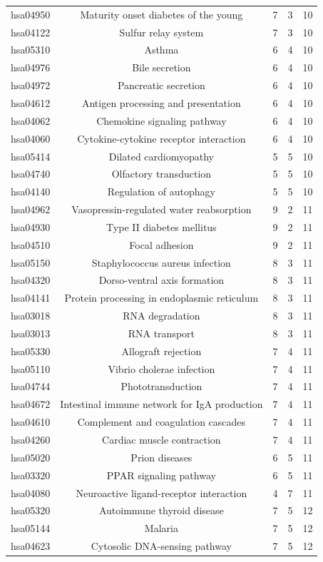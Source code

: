 \documentclass[Minh_PhD_thesis.tex]{subfiles}
\begin{document}
\begin{center}
\begin{longtable}{@{}ccccc@{}}
hsa04950	&Maturity onset diabetes of the young&	7&	3&	10\\
hsa04122	&Sulfur relay system&	7&	3&	10\\
hsa05310	&Asthma&	6&	4&	10\\
hsa04976	&Bile secretion&	6&	4&	10\\
hsa04972	&Pancreatic secretion&	6&	4&	10\\
hsa04612	&Antigen processing and presentation&	6&	4&	10\\
hsa04062	&Chemokine signaling pathway&	6&	4&	10\\
hsa04060	&Cytokine-cytokine receptor interaction&	6&	4&	10\\
hsa05414	&Dilated cardiomyopathy&	5&	5&	10\\
hsa04740	&Olfactory transduction&	5&	5&	10\\
hsa04140	&Regulation of autophagy&	5&	5&	10\\
hsa04962	&Vasopressin-regulated water reabsorption&	9&	2&	11\\
hsa04930	&Type II diabetes mellitus&	9&	2&	11\\
hsa04510	&Focal adhesion&	9&	2&	11\\
hsa05150	&Staphylococcus aureus infection&	8&	3&	11\\
hsa04320	&Dorso-ventral axis formation&	8&	3&	11\\
hsa04141	&Protein processing in endoplasmic reticulum&	8&	3&	11\\
hsa03018	&RNA degradation&	8&	3&	11\\
hsa03013	&RNA transport&	8&	3&	11\\
hsa05330	&Allograft rejection&	7&	4&	11\\
hsa05110	&Vibrio cholerae infection&	7&	4&	11\\
hsa04744	&Phototransduction&	7&	4&	11\\
hsa04672	&Intestinal immune network for IgA production&	7&	4&	11\\
hsa04610	&Complement and coagulation cascades&	7&	4&	11\\
hsa04260	&Cardiac muscle contraction&	7&	4&	11\\
hsa05020	&Prion diseases&	6&	5&	11\\
hsa03320	&PPAR signaling pathway&	6&	5&	11\\
hsa04080	&Neuroactive ligand-receptor interaction&	4&	7&	11\\
hsa05320	&Autoimmune thyroid disease&	7&	5&	12\\
hsa05144	&Malaria&	7&	5&	12\\
hsa04623	&Cytosolic DNA-sensing pathway&	7&	5&	12\\
\hline
 \end{longtable}
\end{center}
\end{document}
